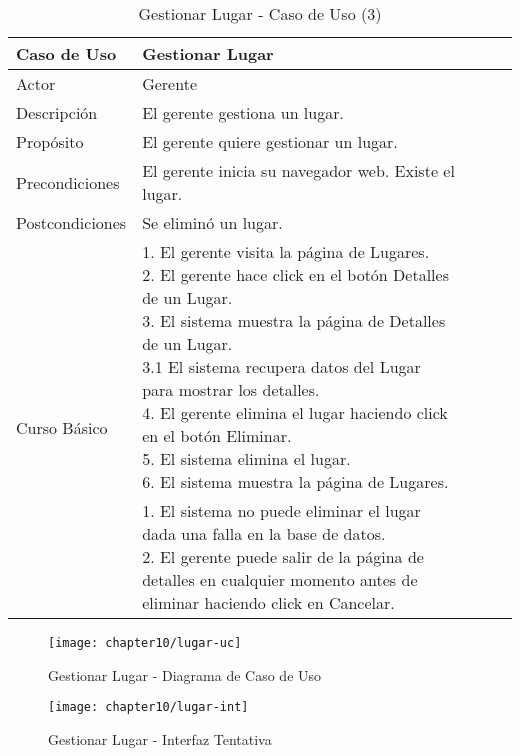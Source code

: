 \begin{table}[H]
    \begin{tabular}{@{} *5l @{}} \toprule
    \textbf{Caso de Uso} & Gestionar Lugar \\ \midrule
    Actor & Gerente \\ 
    Descripción & El gerente gestiona un lugar. \\ 
    Propósito & El gerente quiere gestionar un lugar. \\ \midrule
    Precondiciones & El gerente inicia su navegador web. Existe el lugar.\\ \midrule
    Postcondiciones & Se eliminó un lugar. \\ \midrule
    \multirow{4}{*}{Curso Básico}
        & \parbox{0.75\linewidth}{ 
                1. El gerente visita la página de Lugares. \\
                2. El gerente hace click en el botón Detalles de un Lugar. \\
                3. El sistema muestra la página de Detalles de un Lugar. \\
                    3.1 El sistema recupera datos del Lugar para mostrar los detalles. \\
                4. El gerente elimina el lugar haciendo click en el botón Eliminar. \\
                5. El sistema elimina el lugar.  \\
                6. El sistema muestra la página de Lugares.   
        } \\ \midrule
        & \parbox{0.75\linewidth}{ 
            1. El sistema no puede eliminar el lugar dada una falla en la base de datos. \\
            2. El gerente puede salir de la página de detalles en cualquier momento antes de eliminar haciendo click en Cancelar.
        }  \\  \bottomrule
     \hline
    \end{tabular}
        \caption{Gestionar Lugar - Caso de Uso (3)}
        \label{tab:tabcu-lugar3}
\end{table}
    
    
    \begin{figure}[H]
        \centering
        \texttt{[image: chapter10/lugar-uc]}
        \caption{Gestionar Lugar - Diagrama de Caso de Uso}
        \label{fig:lugar-uc}
    \end{figure}
    
    \begin{figure}[H]
        \centering
        \texttt{[image: chapter10/lugar-int]}
        \caption{Gestionar Lugar - Interfaz Tentativa }
        \label{fig:lugar-int}
    \end{figure}
    
